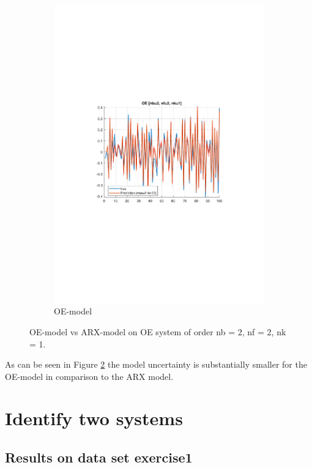 \documentclass[]{article}
\begin{document}
\begin{figure}[ht]
\begin{subfigure}{.49\textwidth}
	\includegraphics[trim= 10cm 8cm 10cm 8cm, scale=0.4]{figures/2e-OE-horizon_1.pdf}
	\caption{OE-model}
	\label{fig:2e-OE-horizon_1}
\end{subfigure}
\caption{OE-model vs ARX-model on OE system of order nb = 2, nf = 2, nk = 1.}
\label{fig:2e-validation}
\end{figure}
As can be seen in Figure \ref{fig:2e-validation} the model uncertainty is substantially smaller for the OE-model in comparison to the ARX model.

\section{Identify two systems}

\subsection{Results on data set exercise1}
\end{document}
